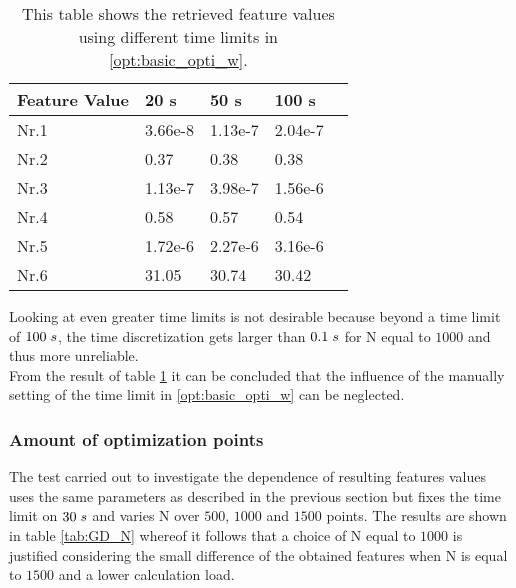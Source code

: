 \begin{table}[h!]
	\centering
	\begin{tabular}{@{}llllr@{}} \toprule
		Feature Value    & 20 s  & 50 s      & 100 s\\ \midrule
		Nr.1       & 3.66e-8     & 1.13e-7   & 2.04e-7\\
		Nr.2       & 0.37        & 0.38      & 0.38\\
		Nr.3       & 1.13e-7     & 3.98e-7   & 1.56e-6 \\
		Nr.4       & 0.58        & 0.57      & 0.54\\
		Nr.5       & 1.72e-6     & 2.27e-6   & 3.16e-6\\
		Nr.6       & 31.05       & 30.74     & 30.42\\ \bottomrule
	\end{tabular}
	\caption{This table shows the retrieved feature values using different time limits in \ref{opt:basic_opti_w}.}
	\label{tab:GD_time_limit}
\end{table}
Looking at even greater time limits is not desirable because beyond a time limit of $100 \hspace{1mm}s$, the time discretization gets larger than $0.1\hspace{1mm}s$ for N equal to $1000$ and thus more unreliable.\\

From the result of table \ref{tab:GD_time_limit} it can be concluded that the influence of the manually setting of the time limit in \ref{opt:basic_opti_w} can be neglected. 




\subsubsection{Amount of optimization points}
The test carried out to investigate the dependence of resulting features values uses the same parameters as described in the previous section but fixes the time limit on $30\hspace{1mm}s$ and varies N over $500$, $1000$ and $1500$ points. The results are shown in table \ref{tab:GD_N} whereof it follows that a choice of N equal to $1000$ is justified considering the small difference of the obtained features when N is equal to $1500$ and a lower calculation load.

